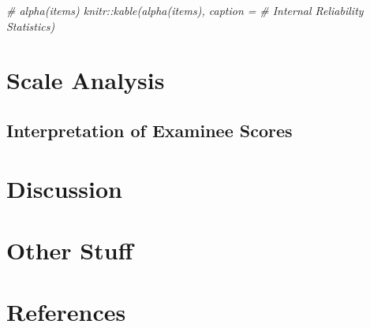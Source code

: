 \documentclass[
]{report}
\newenvironment{Shaded}{\begin{snugshade}}{\end{snugshade}}
\newcommand{\CommentTok}[1]{\textcolor[rgb]{0.56,0.35,0.01}{\textit{#1}}}
\newlength{\cslhangindent}
\newlength{\cslentryspacingunit} %
\newenvironment{CSLReferences}[2] %
 {%
  \setlength{\parindent}{0pt}
  \ifodd #1
  \let\oldpar\par
  \def\par{\hangindent=\cslhangindent\oldpar}
  \fi
  \setlength{\parskip}{#2\cslentryspacingunit}
 }%
 {}
\begin{document}
\begin{Shaded}
\begin{Highlighting}[]
\CommentTok{\# alpha(items) knitr::kable(alpha(items), caption =}
\CommentTok{\# \textquotesingle{}Internal Reliability Statistics\textquotesingle{})}
\end{Highlighting}
\end{Shaded}

\hypertarget{scale-analysis}{%
\chapter{Scale Analysis}\label{scale-analysis}}

\hypertarget{interpretation-of-examinee-scores}{%
\section{Interpretation of Examinee Scores}\label{interpretation-of-examinee-scores}}

\hypertarget{discussion}{%
\chapter{Discussion}\label{discussion}}

\hypertarget{other-stuff}{%
\chapter{Other Stuff}\label{other-stuff}}

\hypertarget{references}{%
\chapter*{References}\label{references}}

\hypertarget{refs}{}
\begin{CSLReferences}{0}{0}
\end{CSLReferences}

  
\end{document}
